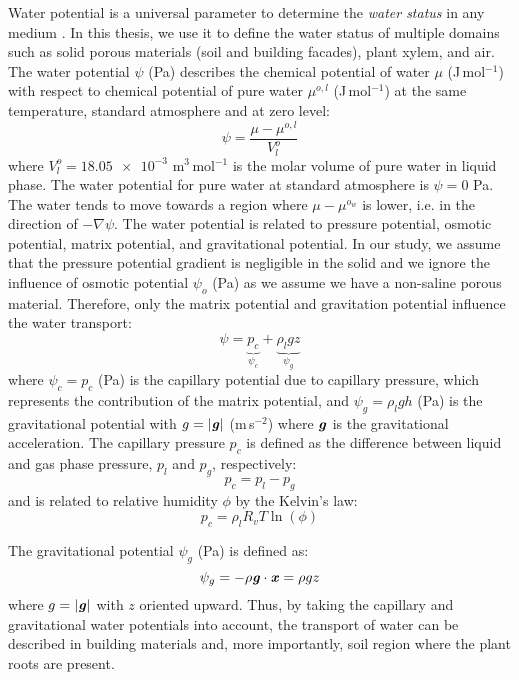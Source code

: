 Water potential is a universal parameter to determine the \textit{water status} in any medium \citep{nobel2009physicochemical}. In this thesis, we use it to define the water status of multiple domains such as solid porous materials (soil and building facades), plant xylem, and air. The water potential $\psi$ (Pa) describes the chemical potential of water $\mu$ (J\,mol$^{-1}$) with respect to chemical potential of pure water $\mu^{o,l}$ (J\,mol$^{-1}$) at the same temperature, standard atmosphere and at zero level:
\begin{equation}
\psi = \frac{\mu - \mu^{o,l}}{V^o_l}
\end{equation}
where $V^o_l = 18.05 \num{e-3}$ m$^3$\,mol$^{-1}$ is the molar volume of pure water in liquid phase. The water potential for pure water at standard atmosphere is $\psi = 0$ Pa. The water tends to move towards a region where $\mu-\mu^{o_w}$ is lower, i.e. in the direction of $-\nabla\psi$. The water potential is related to pressure potential, osmotic potential, matrix potential, and gravitational potential. In our study, we assume that the pressure potential gradient is negligible in the solid and we ignore the influence of osmotic potential $\psi_o$ (Pa) as we assume we have a non-saline porous material. Therefore, only the matrix potential and gravitation potential influence the water transport:
\begin{equation}
\psi = \underbrace{p_c}_{\psi_c} + \underbrace{\rho_l g z}_{\psi_g}
\end{equation}
where $\psi_c = p_c$ (Pa) is the capillary potential due to capillary pressure, which represents the contribution of the matrix potential, and $\psi_g = \rho_l g h$ (Pa) is the gravitational potential with $g = |\textbf{\textit{g}}|$ (m\,s$^{-2}$) where $\textbf{\textit{g}}$ is the gravitational acceleration. The capillary pressure $p_c$ is defined as the difference between liquid and gas phase pressure, $p_l$ and $p_g$, respectively:
\begin{equation}
p_c =  p_l - p_g
\end{equation}
and is related to relative humidity $\phi$ by the Kelvin's law:
\begin{equation}
p_c = \rho_l R_v T \ln \left(\phi\right)
\end{equation}

The gravitational potential $\psi_g$ (Pa) is defined as:
\begin{equation}
\psi_g = - \rho \textbf{\textit{g}} \cdot \textbf{\textit{x}} = \rho g z
\end{equation}
where $g = |\textbf{\textit{g}}|$ with $z$ oriented upward. Thus, by taking the capillary and gravitational water potentials into account, the transport of water can be described in building materials and, more importantly, soil region where the plant roots are present.

